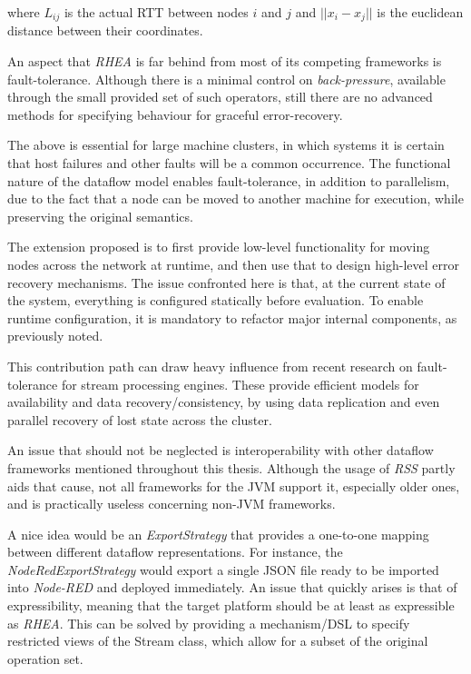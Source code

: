 \documentclass{dithesis}
\begin{document}
where $L_{ij}$ is the actual RTT between nodes $i$ and $j$ and $||x_i - x_j||$ is the euclidean distance between their coordinates.


An aspect that \textit{RHEA} is far behind from most of its competing frameworks is fault-tolerance. Although there is a minimal control on \textit{back-pressure}, available through the small provided set of such operators, still there are no advanced methods for specifying behaviour for graceful error-recovery.

The above is essential for large machine clusters, in which systems it is certain that host failures and other faults will be a common occurrence. The functional nature of the dataflow model enables fault-tolerance, in addition to parallelism, due to the fact that a node can be moved to another machine for execution, while preserving the original semantics.

The extension proposed is to first provide low-level functionality for moving nodes across the network at runtime, and then use that to design high-level error recovery mechanisms. The issue confronted here is that, at the current state of the system, everything is configured statically before evaluation. To enable runtime configuration, it is mandatory to refactor major internal components, as previously noted.

This contribution path can draw heavy influence from recent research on fault-tolerance for stream processing engines\cite{borealis,dstreams,wide_area}. These provide efficient models for availability and data recovery/consistency, by using data replication and even parallel recovery of lost state across the cluster.


An issue that should not be neglected is interoperability with other dataflow frameworks mentioned throughout this thesis. Although the usage of \textit{RSS} partly aids that cause, not all frameworks for the JVM support it, especially older ones, and is practically useless concerning non-JVM frameworks.

A nice idea would be an \textit{ExportStrategy} that provides a one-to-one mapping between different dataflow representations. For instance, the \textit{NodeRedExportStrategy} would export a single JSON file ready to be imported into \textit{Node-RED} and deployed immediately. An issue that quickly arises is that of expressibility, meaning that the target platform should be at least as expressible as \textit{RHEA}. This can be solved by providing a mechanism/DSL to specify restricted views of the Stream class, which allow for a subset of the original operation set. 
\end{document}

